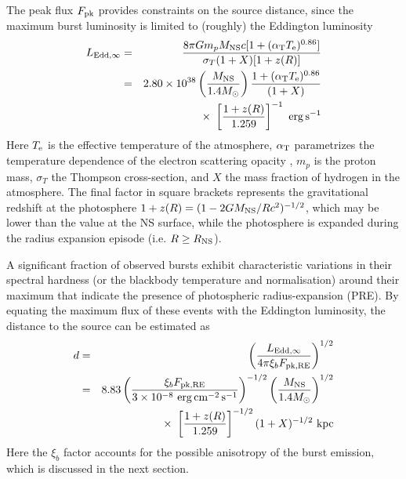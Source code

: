 \documentclass{aastex61}
\newcommand{\eps}{{\rm erg\,s^{-1}}}
\newcommand{\epcs}{{\rm erg\,cm^{-2}\,s^{-1}}}
\begin{document}
The peak flux $F_{\rm pk}$ provides constraints on the source distance, since the maximum burst luminosity is limited to (roughly) the Eddington luminosity \cite[e.g.][]{lew93}
\begin{eqnarray}
  L_{\rm Edd,\infty} & = & \frac{8\pi G m_p M_{\rm NS} c
  [1+(\alpha_{\rm T}T_{\rm e})^{0.86}]} {\sigma_T(1+X)[1+z(R)]} %
       \nonumber \\
  & = & 2.80\times10^{38} \left(\frac{M_{\rm NS}}{1.4M_\odot}\right)
 \frac{1+(\alpha_{\rm T}T_{\rm e})^{0.86}}{(1+X)}
\nonumber \\ & & \times\  %
    \left[\frac{1+z(R)}{1.259}\right]^{-1}\ %
              \eps
  \label{ledd}
\end{eqnarray}
Here
$T_{\rm e}$ is the
effective temperature of the atmosphere, $\alpha_{\rm T}$ parametrizes the temperature dependence of the electron scattering
opacity \cite[$\simeq 2.2\times10^{-9}$~K$^{-1}$;][]{lew93},
$m_p$ is the proton mass, $\sigma_T$ the Thompson 
cross-section, and $X$ the
mass fraction of hydrogen in the atmosphere.
The final factor in
square brackets represents the gravitational redshift 
at the photosphere $1+z(R)=(1-2GM_{\rm NS}/R
c^2)^{-1/2}$, which may be lower than the value at the NS surface, while the photosphere is expanded during the radius expansion episode (i.e. $R\ge R_{\rm NS}$).


A significant fraction of observed bursts exhibit characteristic variations in their spectral hardness (or the blackbody temperature and normalisation) around their maximum that indicate the presence of photospheric radius-expansion (PRE). By equating the maximum flux of these events with the Eddington luminosity, the distance to the source can be estimated as
\begin{eqnarray}
 d & = & \left(\frac{L_{\rm Edd,\infty}}{4\pi \xi_b F_{\rm pk, RE}}\right)^{1/2} \nonumber \\
   & = & 8.83
	\left( \frac{\xi_b F_{\rm pk, RE}}{3\times10^{-8}\ \epcs} \right)^{-1/2}
       	\left(\frac{M_{\rm NS}}{1.4M_\odot}\right)^{1/2}
\nonumber \\ & & \times\  %
	\left[\frac{1+z(R)}{1.259}\right]^{-1/2}
	(1+X)^{-1/2}\ {\rm kpc}
 \label{disteq}
\end{eqnarray}
% 
Here the $\xi_b$ factor accounts for the possible anisotropy of the burst emission, 
which is discussed in the next section.
\end{document}
